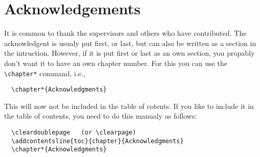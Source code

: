\chapter*{Acknowledgements}

It is common to thank the supervisors and others who have contributed.
The acknowledgent is usualy put first, or last, but can also be
written as a section in the intruction. However, if it is put first
or last as an own section, you propably don't want it to have an own
chapter number. For this you can use the \verb+\chapter*+ command, i.e.,
\begin{verbatim}
  \chapter*{Acknowledgments}
\end{verbatim}
This will now not be included in the table of cotents. If you
like to include it in the table of contents, you need to do this
manualy as follows:
\begin{verbatim}
  \cleardoublepage   (or \clearpage)
  \addcontentsline{toc}{chapter}{Acknowledgments}
  \chapter*{Acknowledgments}
\end{verbatim}

\cleardoublepage
